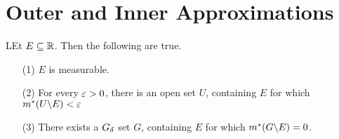 \section{Outer and Inner Approximations}

\begin{theorem}\label{8.4.1}
    LEt $E \subseteq \mathbb{R}$. Then the following are true.
    \begin{enumerate}
        \item[(1)] $E$ is measurable.

        \item[(2)] For every $\varepsilon>0$, there is an open set  $U$, containing  $E$
            for which $m^\ast(U \backslash E)<\varepsilon$

        \item[(3)] There exists a $G_\delta$ set  $G$, containing $E$ for which
            $m^\ast(G \backslash E)=0$.
    \end{enumerate}
\end{theorem}
